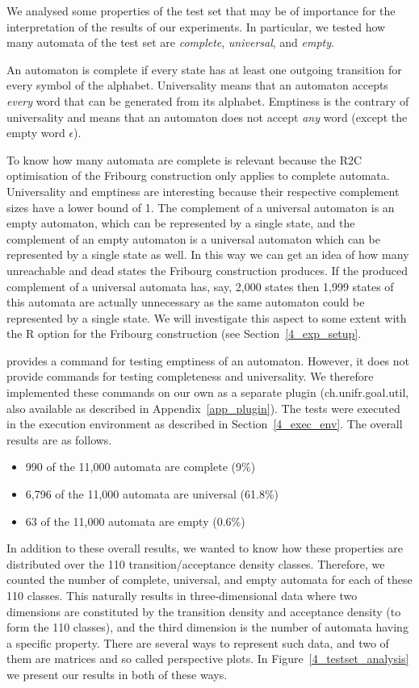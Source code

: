 We analysed some properties of the \goal{} test set that may be of importance for the interpretation of the results of our experiments. In particular, we tested how many automata of the \goal{} test set are \textit{complete}, \textit{universal}, and \textit{empty}.

An automaton is complete if every state has at least one outgoing transition for every symbol of the alphabet. Universality means that an automaton accepts \textit{every} word that can be generated from its alphabet. Emptiness is the contrary of universality and means that an automaton does not accept \textit{any} word (except the empty word $\epsilon$).

To know how many automata are complete is relevant because the R2C optimisation of the Fribourg construction only applies to complete automata. Universality and emptiness are interesting because their respective complement sizes have a lower bound of 1. The complement of a universal automaton is an empty automaton, which can be represented by a single state, and the complement of an empty automaton is a universal automaton which can be represented by a single state as well. In this way we can get an idea of how many unreachable and dead states the Fribourg construction produces. If the produced complement of a universal automata has, say, 2,000 states then 1,999 states of this automata are actually unnecessary as the same automaton could be represented by a single state. We will investigate this aspect to some extent with the R option for the Fribourg construction (see Section~\ref{4_exp_setup}.

\goal{} provides a command for testing emptiness of an automaton. However, it does not provide commands for testing completeness and universality. We therefore implemented these commands on our own as a separate \goal{} plugin (\textsf{ch.unifr.goal.util}, also available as described in Appendix~\ref{app_plugin}). The tests were executed in the execution environment as described in Section~\ref{4_exec_env}. The overall results are as follows.

\begin{itemize}
\item 990 of the 11,000 automata are complete (9\%)
\item 6,796 of the 11,000 automata are universal (61.8\%)
\item 63 of the 11,000 automata are empty (0.6\%)
\end{itemize}

In addition to these overall results, we wanted to know how these properties are distributed over the 110 transition/acceptance density classes. Therefore, we counted the number of complete, universal, and empty automata for each of these 110 classes. This naturally results in three-dimensional data where two dimensions are constituted by the transition density and acceptance density (to form the 110 classes), and the third dimension is the number of automata having a specific property. There are several ways to represent such data, and two of them are matrices and so called perspective plots. In Figure~\ref{4_testset_analysis} we present our results in both of these ways. 

